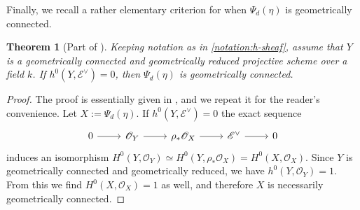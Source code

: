 \documentclass[12 pt]{amsart}
\theoremstyle{plain}
\newtheorem{theorem}[subsection]{Theorem}
\theoremstyle{definition}
\newtheorem{remark}[theorem]{Remark}
\theoremstyle{remark}
\numberwithin{equation}{section}
\newcommand\sce{\mathscr E}
\newcommand\sch{\mathscr H}
\newcommand\sco{\mathscr O}
\DeclareMathOperator\spec{\operatorname{Spec}}
\DeclareMathOperator\sym{Sym}
\begin{document}
Finally, we recall a rather elementary criterion for when
$\Psi_d(\eta)$ is geometrically connected.
\begin{theorem}[Part of ]
	\label{theorem:bertini-3-4-5}
	Keeping notation as in \autoref{notation:h-sheaf},
	assume that
	$Y$ is a 
	geometrically connected and geometrically reduced projective scheme over
	a field $k$.
	If $h^0(Y, \sce^\vee) =
0$, then $\Psi_d(\eta)$ is geometrically connected.  
\end{theorem}
\begin{proof} The proof is essentially given in \cite[Thm.\
	3.6]{casnatiE:covers-algebraic-varieties}, and we repeat it for the
	reader's convenience.  
	Let $X := \Psi_d(\eta)$.	
	If $h^0(Y, \sce^\vee) = 0$
	the exact sequence \begin{equation} \label{equation:} \begin{tikzcd} 0
	\ar {r} & \sco_Y \ar {r} & \rho_* \sco_X \ar {r} & \sce^\vee \ar {r} & 0
	\end{tikzcd}\end{equation} induces an isomorphism $H^0(Y, \sco_Y) \simeq
	H^0(Y, \rho_* \sco_X) = H^0(X, \sco_X)$.  Since $Y$ is geometrically
	connected and geometrically reduced, we have $h^0(Y, \sco_Y) = 1$.  From
	this we find $H^0(X, \sco_X) = 1$ as well, and therefore $X$ is
	necessarily geometrically connected.  \end{proof} 
\end{document}
